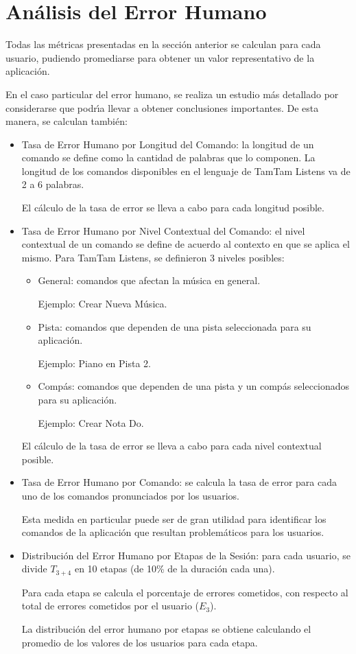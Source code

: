 \section{An\'alisis del Error Humano}
\label{sec:evaluacionError}
Todas las m\'etricas presentadas en la secci\'on anterior se calculan para cada usuario,
pudiendo promediarse para obtener un valor representativo de la aplicaci\'on.

En el caso particular del error humano, se realiza un estudio m\'as detallado
por considerarse que podr{\'\i}a llevar a obtener conclusiones importantes. 
De esta manera, se calculan tambi\'en:

\begin{itemize}
	\item Tasa de Error Humano por Longitud del Comando: la longitud de un comando se define
	como la cantidad de palabras que lo componen. La longitud de los comandos disponibles en el 
	lenguaje de TamTam Listens va de 2 a 6 palabras.

	El c\'alculo de la tasa de error se lleva a cabo para cada longitud posible.  


	\item Tasa de Error Humano por Nivel Contextual del Comando: el nivel contextual de un comando
	se define de acuerdo al contexto en que se aplica el mismo.
	Para TamTam Listens, se definieron 3 niveles posibles:
		\begin{itemize}
			\item General: comandos que afectan la m\'usica en general. 

			Ejemplo: Crear Nueva M\'usica.
			\item Pista: comandos que dependen de una pista seleccionada para su aplicaci\'on. 

			Ejemplo: Piano en Pista 2.
			\item Comp\'as: comandos que dependen de una pista y un comp\'as seleccionados 
			para su aplicaci\'on. 

			Ejemplo: Crear Nota Do.
		\end{itemize}
	
		
	El c\'alculo de la tasa de error se lleva a cabo para cada nivel contextual posible.

	\item Tasa de Error Humano por Comando: se calcula la tasa de error para cada uno
	de los comandos pronunciados por los usuarios.

	Esta medida en particular puede ser de gran utilidad para identificar los comandos de la
	aplicaci\'on que resultan problem\'aticos para los usuarios.
	
	\item Distribuci\'on del Error Humano por Etapas de la Sesi\'on: para cada usuario, 
	se divide $T_{3+4}$ en 10 etapas (de 10\% de la duraci\'on cada una).

	Para cada etapa se calcula el porcentaje de errores cometidos, con respecto al total de
	errores cometidos por el usuario ($E_3$).

	La distribuci\'on del error humano por etapas se obtiene calculando 
	el promedio de los valores de los usuarios para cada etapa.
   
\end{itemize}
